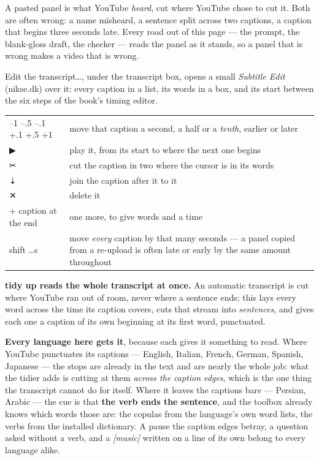 \documentclass[11pt,oneside]{report}
\newcommand{\sym}[1]{{\symfont #1}}
\newcommand{\menu}[1]{\textsf{#1}}
\begin{document}
A pasted panel is what YouTube \emph{heard}, cut where YouTube chose to cut
it. Both are often wrong: a name misheard, a sentence split across two
captions, a caption that begins three seconds late. Every road out of this
page --- the prompt, the blank-gloss draft, the checker --- reads the panel as
it stands, so a panel that is wrong makes a video that is wrong.

\menu{Edit the transcript\ldots}, under the transcript box, opens a small
\emph{Subtitle Edit} (nikse.dk) over it: every caption in a list, its words
in a box, and its start between the six steps of the book's timing
editor.

\begin{center}
\begin{tabular}{@{}l>{\raggedright\arraybackslash}p{}@{}}
\toprule
\menu{--1} \menu{--.5} \menu{--.1} \menu{+.1} \menu{+.5} \menu{+1} &
  move that caption a second, a half or a \emph{tenth}, earlier or later \\
\menu{\sym{▶}} & play it, from its start to where the next one begins \\
\menu{\sym{✂}} & cut the caption in two where the cursor is in its words \\
\menu{\sym{⇣}} & join the caption after it to it \\
\menu{\sym{✕}} & delete it \\
\menu{+ caption at the end} & one more, to give words and a time \\
\menu{shift \ldots s} & move \emph{every} caption by that many seconds ---
  a panel copied from a re-upload is often late or early by the same amount
  throughout \\
\bottomrule
\end{tabular}
\end{center}

\textbf{\menu{tidy up} reads the whole transcript at once.} An automatic
transcript is cut where YouTube ran out of room, never where a sentence ends;
this lays every word across the time its caption covers, cuts that stream into
\emph{sentences}, and gives each one a caption of its own beginning at its
first word, punctuated.

\textbf{Every language here gets it}, because each gives it something to
read. Where YouTube punctuates its captions --- English, Italian, French,
German, Spanish, Japanese --- the stops are already in the text and are nearly
the whole job: what the tidier adds is cutting at them \emph{across the
caption edges}, which is the one thing the transcript cannot do for itself.
Where it leaves the captions bare --- Persian, Arabic --- the cue is that
\textbf{the verb ends the sentence}, and the toolbox already knows which
words those are: the copulas from the language's own word lists, the verbs
from the installed dictionary. A pause the caption edges betray, a question
asked without a verb, and a \emph{[music]} written on a line of its own
belong to every language alike.
\end{document}
